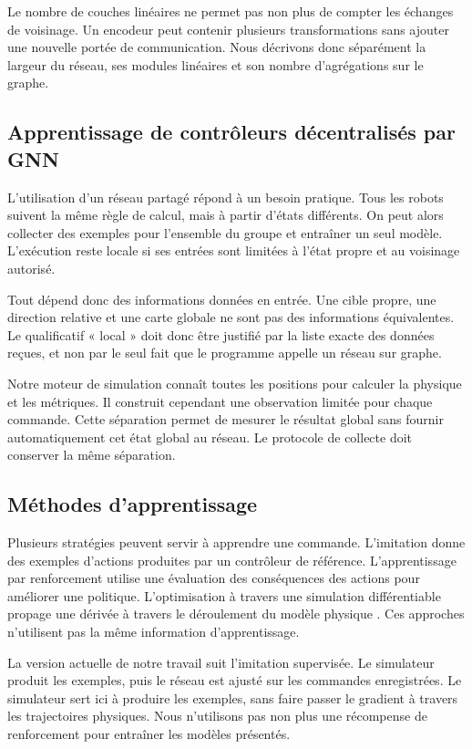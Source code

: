 Le nombre de couches linéaires ne permet pas non plus de compter les échanges de voisinage. Un encodeur peut contenir plusieurs transformations sans ajouter une nouvelle portée de communication. Nous décrivons donc séparément la largeur du réseau, ses modules linéaires et son nombre d'agrégations sur le graphe.

\subsection{Apprentissage de contrôleurs décentralisés par GNN}
L'utilisation d'un réseau partagé répond à un besoin pratique. Tous les robots suivent la même règle de calcul, mais à partir d'états différents. On peut alors collecter des exemples pour l'ensemble du groupe et entraîner un seul modèle. L'exécution reste locale si ses entrées sont limitées à l'état propre et au voisinage autorisé.

Tout dépend donc des informations données en entrée. Une cible propre, une direction relative et une carte globale ne sont pas des informations équivalentes. Le qualificatif « local » doit donc être justifié par la liste exacte des données reçues, et non par le seul fait que le programme appelle un réseau sur graphe.

Notre moteur de simulation connaît toutes les positions pour calculer la physique et les métriques. Il construit cependant une observation limitée pour chaque commande. Cette séparation permet de mesurer le résultat global sans fournir automatiquement cet état global au réseau. Le protocole de collecte doit conserver la même séparation.

\subsection{Méthodes d'apprentissage}
Plusieurs stratégies peuvent servir à apprendre une commande. L'imitation donne des exemples d'actions produites par un contrôleur de référence. L'apprentissage par renforcement utilise une évaluation des conséquences des actions pour améliorer une politique. L'optimisation à travers une simulation différentiable propage une dérivée à travers le déroulement du modèle physique \cite{belbute2018}. Ces approches n'utilisent pas la même information d'apprentissage.

La version actuelle de notre travail suit l'imitation supervisée. Le simulateur produit les exemples, puis le réseau est ajusté sur les commandes enregistrées. Le simulateur sert ici à produire les exemples, sans faire passer le gradient à travers les trajectoires physiques. Nous n'utilisons pas non plus une récompense de renforcement pour entraîner les modèles présentés.


